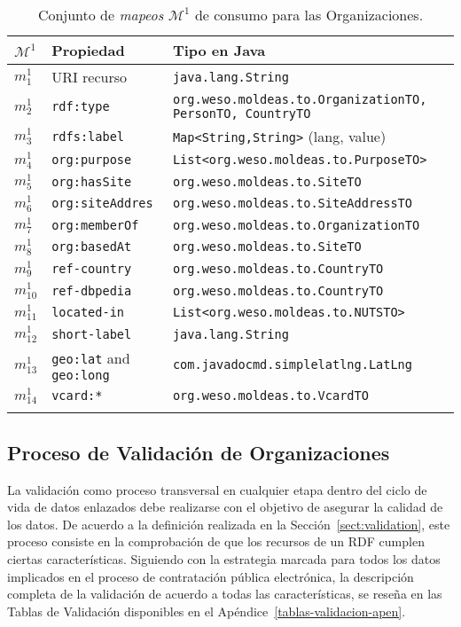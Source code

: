 \begin{longtable}[c]{|p{2cm}|p{4.5cm}|p{8cm}|} 
\hline
  \textbf{$\mathcal{M}^1$} &  \textbf{Propiedad} & \textbf{Tipo en Java} \\\hline
\endhead
 $m^1_1$ & URI recurso     		& \texttt{java.lang.String} \\ \hline
 $m^1_2$ & \texttt{rdf:type}      	& \texttt{org.weso.moldeas.to.{OrganizationTO, PersonTO, CountryTO}}\\ \hline
 $m^1_3$ & \texttt{rdfs:label} 		& \texttt{Map<String,String>} (lang, value) \\ \hline
 $m^1_4$ & \texttt{org:purpose} 	& \texttt{List<org.weso.moldeas.to.PurposeTO>} \\ \hline
 $m^1_5$ & \texttt{org:hasSite}    	& \texttt{org.weso.moldeas.to.SiteTO} \\ \hline
 $m^1_6$ & \texttt{org:siteAddres} 	& \texttt{org.weso.moldeas.to.SiteAddressTO}  \\ \hline
 $m^1_7$ & \texttt{org:memberOf} 	& \texttt{org.weso.moldeas.to.OrganizationTO}\\ \hline
 $m^1_8$ & \texttt{org:basedAt} 	& \texttt{org.weso.moldeas.to.SiteTO} \\ \hline
 $m^1_9$ & \texttt{ref-country} 	& \texttt{org.weso.moldeas.to.CountryTO} \\ \hline  
 $m^1_{10}$ & \texttt{ref-dbpedia} & \texttt{org.weso.moldeas.to.CountryTO}   \\ \hline
 $m^1_{11}$ & \texttt{located-in}    & \texttt{List<org.weso.moldeas.to.NUTSTO>} \\ \hline   
 $m^1_{12}$ & \texttt{short-label} & \texttt{java.lang.String}\\ \hline   
 $m^1_{13}$ & \texttt{geo:lat} and  \texttt{geo:long} & \texttt{com.javadocmd.simplelatlng.LatLng} \\ \hline   
 $m^1_{14}$ & \texttt{vcard:*} 		& \texttt{org.weso.moldeas.to.VcardTO} \\ \hline   
\hline
\caption{Conjunto de \textit{mapeos} $\mathcal{M}^1$ de consumo para las Organizaciones.}\label{table:orgs-consumo}\\    
\end{longtable}

\subsection{Proceso de Validación de Organizaciones}
La validación como proceso transversal en cualquier etapa dentro del ciclo de vida de datos 
enlazados debe realizarse con el objetivo de asegurar la calidad de los datos. De acuerdo a la 
definición realizada en la Sección~\ref{sect:validation}, este proceso consiste en la comprobación 
de que los recursos de un \dataset RDF cumplen ciertas características. Siguiendo con la estrategia marcada para 
todos los datos implicados en el proceso de contratación pública electrónica, la descripción completa de la validación de acuerdo 
a todas las características, se reseña en las Tablas de Validación disponibles en el Apéndice~\ref{tablas-validacion-apen}.

